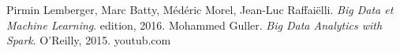 


\begin{thebibliography}{ABC}	
     Pirmin Lemberger, Marc Batty, Médéric Morel, Jean-Luc Raffaiëlli. \emph{Big Data et Machine Learning}. edition, 2016.
     Mohammed Guller. \emph{Big Data Analytics with Spark}. O'Reilly, 2015.
      youtub.com
\end{thebibliography}

